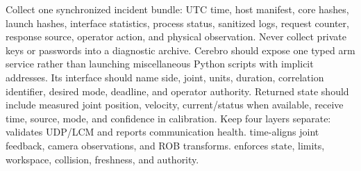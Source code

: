 {}
\markdownRendererSectionEnd 
\markdownRendererSectionEnd \markdownRendererSectionBegin
{}\markdownRendererInterblockSeparator
{}\markdownRendererInterblockSeparator
{}Collect one synchronized incident bundle: UTC time, host manifest, core hashes, launch hashes, interface statistics, process status, sanitized logs, request counter, response source, operator action, and physical observation. Never collect private keys or passwords into a diagnostic archive.\markdownRendererInterblockSeparator
{}
\markdownRendererSectionEnd \markdownRendererSectionBegin
{}\markdownRendererInterblockSeparator
{}Cerebro should expose one typed arm service rather than launching miscellaneous Python scripts with implicit addresses. Its interface should name side, joint, units, duration, correlation identifier, desired mode, deadline, and operator authority. Returned state should include measured joint position, velocity, current/status when available, receive time, source, mode, and confidence in calibration.\markdownRendererParagraphSeparator
{}Keep four layers separate:\markdownRendererInterblockSeparator
{}\markdownRendererOlBegin
{} validates UDP/LCM and reports communication health.\markdownRendererOlItemEnd 
{} time-aligns joint feedback, camera observations, and ROB transforms.\markdownRendererOlItemEnd 
{} enforces state, limits, workspace, collision, freshness, and authority.\markdownRendererOlItemEnd 
